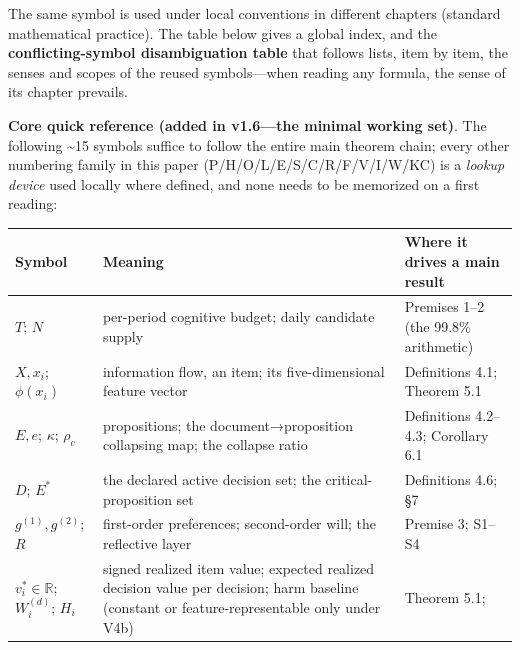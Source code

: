 \documentclass[
  11pt]{article}
\begin{document}
The same symbol is used under local conventions in different chapters
(standard mathematical practice). The table below gives a global index,
and the \textbf{conflicting-symbol disambiguation table} that follows
lists, item by item, the senses and scopes of the reused symbols---when
reading any formula, the sense of its chapter prevails.

\textbf{Core quick reference (added in v1.6---the minimal working set)}.
The following \textasciitilde15 symbols suffice to follow the entire
main theorem chain; every other numbering family in this paper
(P/H/O/L/E/S/C/R/F/V/I/W/KC) is a \emph{lookup device} used locally
where defined, and none needs to be memorized on a first reading:

\begin{longtable}[]{@{}
  >{\raggedright\arraybackslash}p{}
  >{\raggedright\arraybackslash}p{}
  >{\raggedright\arraybackslash}p{}@{}}
\toprule\noalign{}
\begin{minipage}[b]{\linewidth}\raggedright
Symbol
\end{minipage} & \begin{minipage}[b]{\linewidth}\raggedright
Meaning
\end{minipage} & \begin{minipage}[b]{\linewidth}\raggedright
Where it drives a main result
\end{minipage} \\
\midrule\noalign{}
\endhead
\bottomrule\noalign{}
\endlastfoot
\(T\); \(N\) & per-period cognitive budget; daily candidate supply &
Premises 1--2 (the 99.8\% arithmetic) \\
\(X, x_i\); \(\phi(x_i)\) & information flow, an item; its
five-dimensional feature vector & Definitions 4.1; Theorem 5.1 \\
\(E, e\); \(\kappa\); \(\rho_c\) & propositions; the
document→proposition collapsing map; the collapse ratio & Definitions
4.2--4.3; Corollary 6.1 \\
\(D\); \(E^*\) & the declared active decision set; the
critical-proposition set & Definitions 4.6; §7 \\
\(g^{(1)}, g^{(2)}\); \(R\) & first-order preferences; second-order
will; the reflective layer & Premise 3; S1--S4 \\
\(v_i^*\in\mathbb R\); \(W_i^{(d)}\); \(H_i\) & signed realized item
value; expected realized decision value per decision; harm baseline
(constant or feature-representable only under V4b) & Theorem 5.1;

\end{longtable}
\end{document}
